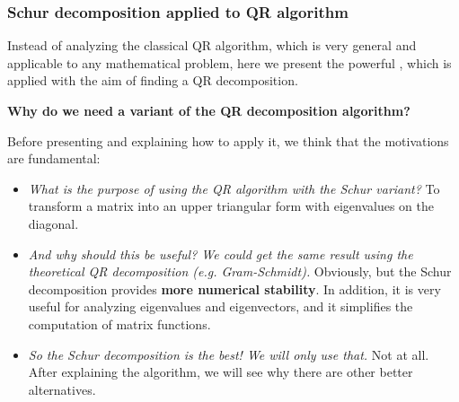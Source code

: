 \subsubsection{Schur decomposition applied to QR algorithm}\label{subsubsection: Schur decomposition applied to QR algorithm}

Instead of analyzing the classical QR algorithm, which is very general and applicable to any mathematical problem, here we present the powerful , which is applied with the aim of finding a QR decomposition.

\highspace
\begin{flushleft}
    \textcolor{Green3}{ \textbf{Why do we need a variant of the QR decomposition algorithm?}}
\end{flushleft}
Before presenting and explaining how to apply it, we think that the motivations are fundamental:
\begin{itemize}
    \item \emph{What is the purpose of using the QR algorithm with the Schur variant?} To transform a matrix into an upper triangular form with eigenvalues on the diagonal.
    
    \item \emph{And why should this be useful? We could get the same result using the theoretical QR decomposition (e.g. Gram-Schmidt).} Obviously, but the Schur decomposition provides \textbf{more numerical stability}. In addition, it is very useful for analyzing eigenvalues and eigenvectors, and it simplifies the computation of matrix functions.
    
    \item \emph{So the Schur decomposition is the best! We will only use that.} Not at all. After explaining the algorithm, we will see why there are other better alternatives.
\end{itemize}

